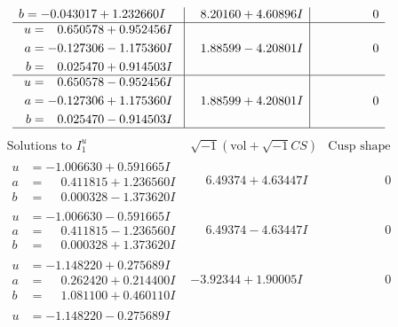 \documentclass[1p]{elsarticle_modified}
\theoremstyle{definition}
\newcommand{\I}{\sqrt{-1}}
\begin{document}
$$\begin{array}{c|c|c}
\begin{aligned}
b &= -0.043017 + 1.232660 I\end{aligned}
 & \phantom{-}8.20160 + 4.60896 I & \phantom{-0.000000 } 0 \\ \hline\begin{aligned}
u &= \phantom{-}0.650578 + 0.952456 I \\
a &= -0.127306 - 1.175360 I \\
b &= \phantom{-}0.025470 + 0.914503 I\end{aligned}
 & \phantom{-}1.88599 - 4.20801 I & \phantom{-0.000000 } 0 \\ \hline\begin{aligned}
u &= \phantom{-}0.650578 - 0.952456 I \\
a &= -0.127306 + 1.175360 I \\
b &= \phantom{-}0.025470 - 0.914503 I\end{aligned}
 & \phantom{-}1.88599 + 4.20801 I & \phantom{-0.000000 } 0\\
 \hline 
 \end{array}$$\newpage$$\begin{array}{c|c|c}  
\text{Solutions to }I^u_{1}& \I (\text{vol} + \sqrt{-1}CS) & \text{Cusp shape}\\
 \hline 
\begin{aligned}
u &= -1.006630 + 0.591665 I \\
a &= \phantom{-}0.411815 + 1.236560 I \\
b &= \phantom{-}0.000328 - 1.373620 I\end{aligned}
 & \phantom{-}6.49374 + 4.63447 I & \phantom{-0.000000 } 0 \\ \hline\begin{aligned}
u &= -1.006630 - 0.591665 I \\
a &= \phantom{-}0.411815 - 1.236560 I \\
b &= \phantom{-}0.000328 + 1.373620 I\end{aligned}
 & \phantom{-}6.49374 - 4.63447 I & \phantom{-0.000000 } 0 \\ \hline\begin{aligned}
u &= -1.148220 + 0.275689 I \\
a &= \phantom{-}0.262420 + 0.214400 I \\
b &= \phantom{-}1.081100 + 0.460110 I\end{aligned}
 & -3.92344 + 1.90005 I & \phantom{-0.000000 } 0 \\ \hline\begin{aligned}
u &= -1.148220 - 0.275689 I \\

\end{aligned}
\end{array}$$
\end{document}
